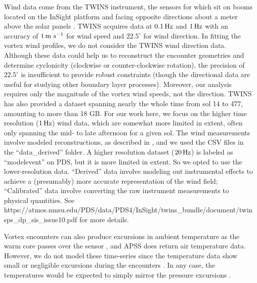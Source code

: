 \documentclass{aastex63}
\begin{document}
Wind data come from the TWINS instrument, the sensors for which sit on booms located on the InSight platform and facing opposite directions about a meter above the solar panels \citep{2020NatGe..13..190B}. TWINS acquires data at $0.1\, {\rm Hz}$ and $1\, {\rm Hz}$ with an accuracy of $1\, {\rm m\ s^{-1}}$ for wind speed and $22.5^\circ$ for wind direction. In fitting the vortex wind profiles, we do not consider the TWINS wind direction data. Although these data could help us to reconstruct the encounter geometries and determine cyclonicity (clockwise or counter-clockwise rotation), the precision of $22.5^\circ$ is insufficient to provide robust constraints (though the directional data are useful for studying other boundary layer processes). Moreover, our analysis requires only the magnitude of the vortex wind speeds, not the direction. TWINS has also provided a dataset spanning nearly the whole time from sol 14 to 477, amounting to more than 18 GB. For our work here, we focus on the higher time resolution ($1\, {\rm Hz}$) wind data, which are somewhat more limited in extent, often only spanning the mid- to late afternoon for a given sol. The wind measurements involve modeled reconstructions, as described in \citet{Banfield2019}, and we used the CSV files in the ``data\_derived'' folder. A higher resolution dataset ($20\,{\rm Hz}$) is labeled as ``modelevent'' on PDS, but it is more limited in extent. So we opted to use the lower-resolution data. ``Derived'' data involve modeling out instrumental effects to achieve a (presumably) more accurate representation of the wind field; ``Calibrated'' data involve converting the raw instrument measurements to physical quantities. See https://atmos.nmsu.edu/PDS/data/PDS4/InSight/twins\_bundle/document/twinsps\_dp\_sis\_issue10.pdf for more details.

Vortex encounters can also produce excursions in ambient temperature as the warm core passes over the sensor \citep{2016SSRv..203...39M}, and APSS does return air temperature data. However, we do not model these time-series since the temperature data show small or negligible excursions during the encounters \citep{2021Icar..35514119L}. In any case, the temperatures would be expected to simply mirror the pressure excursions \citep{2016Icar..271..326L}.
\end{document}
